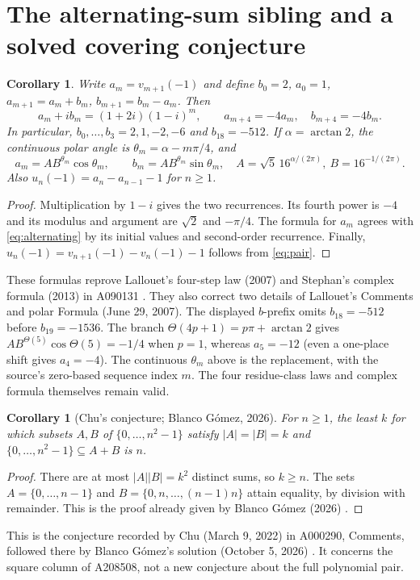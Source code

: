 \documentclass[11pt]{article}
\newtheorem{corollary}[theorem]{Corollary}
\begin{document}
\section{The alternating-sum sibling and a solved covering conjecture}
\begin{corollary}\label{cor:complex}
Write $a_m=v_{m+1}(-1)$ and define $b_0=2$,
$a_0=1$, $a_{m+1}=a_m+b_m$, $b_{m+1}=b_m-a_m$.
Then
\[
a_m+ib_m=(1+2i)(1-i)^m,\qquad a_{m+4}=-4a_m,\quad b_{m+4}=-4b_m.
\]
In particular,
$b_0,\ldots,b_3=2,1,-2,-6$ and $b_{18}=-512$.
If $\alpha=\arctan 2$, the continuous polar angle is
$\theta_m=\alpha-m\pi/4$, and
\[
a_m=A B^{\theta_m}\cos\theta_m,\qquad
b_m=A B^{\theta_m}\sin\theta_m,
\quad A=\sqrt5\,16^{\alpha/(2\pi)},\ B=16^{-1/(2\pi)}.
\]
Also $u_n(-1)=a_n-a_{n-1}-1$ for $n\geq1$.
\end{corollary}
\begin{proof}
Multiplication by $1-i$ gives the two recurrences. Its fourth power is
$-4$ and its modulus and argument are $\sqrt2$ and $-\pi/4$.
The formula for $a_m$ agrees with \eqref{eq:alternating} by its initial
values and second-order recurrence. Finally,
$u_n(-1)=v_{n+1}(-1)-v_n(-1)-1$ follows from \eqref{eq:pair}.
\end{proof}

These formulas reprove Lallouet's four-step law (2007) and Stephan's
complex formula (2013) in A090131 \cite{a090131}.
They also correct two details of Lallouet's Comments and polar Formula
(June 29, 2007). The displayed $b$-prefix omits $b_{18}=-512$ before
$b_{19}=-1536$. The branch
$\Theta(4p+1)=p\pi+\arctan2$ gives $A B^{\Theta(5)}\cos\Theta(5)=-1/4$
when $p=1$, whereas $a_5=-12$ (even a one-place shift gives $a_4=-4$).
The continuous $\theta_m$ above is the replacement, with the source's
zero-based sequence index $m$. The four residue-class laws and complex
formula themselves remain valid.

\begin{corollary}[Chu's conjecture; Blanco G\'omez, 2026]\label{cor:chu}
For $n\geq1$, the least $k$ for which subsets $A,B$ of
$\{0,\ldots,n^2-1\}$ satisfy $|A|=|B|=k$ and
$\{0,\ldots,n^2-1\}\subseteq A+B$ is $n$.
\end{corollary}
\begin{proof}
There are at most $|A||B|=k^2$ distinct sums, so $k\geq n$.
The sets $A=\{0,\ldots,n-1\}$ and
$B=\{0,n,\ldots,(n-1)n\}$ attain equality, by division with remainder.
This is the proof already given by Blanco G\'omez (2026) \cite{blanco}.
\end{proof}
This is the conjecture recorded by Chu (March 9, 2022) in A000290,
Comments, followed there by Blanco G\'omez's solution (October 5, 2026)
\cite{a000290}. It concerns the square column of A208508, not a new
conjecture about the full polynomial pair.
\end{document}
